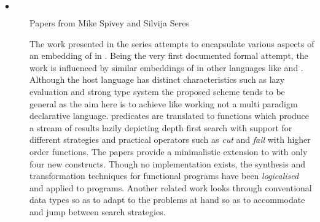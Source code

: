 \documentclass[thesis-solanki.tex]{subfiles}
\begin{document}
\begin{description}

\item[$\bullet$] Papers from Mike Spivey and Silvija Seres


The work presented in the series
\cite{spivey1999embedding,seres1999algebra,seres2001higher,spivey1999algebra,seres2001algebra} attempts to
encapsulate various aspects of an embedding of  in .
Being the very first documented formal attempt, the work is influenced by similar embeddings of 
in other languages like  and .
Although the host language has distinct characteristics such as lazy evaluation and strong type system the proposed
scheme tends to be general as the aim here is to achieve  like working not a multi paradigm
declarative language.
 predicates are translated to  functions which produce a stream of results
lazily depicting depth first search with support for different strategies and practical operators such as
\textit{cut} and \textit{fail} with higher order functions.
The papers provide a minimalistic extension to  with only four new constructs.
Though no implementation exists, the synthesis and transformation techniques for functional programs have been
\textit{logicalised} and applied to  programs.
Another related work \cite{spivey2000functional} looks through conventional data types so as to adapt to the
problems at hand so as to accommodate and jump between search strategies.

\begin{comment}
\begin{enumerate}

\item Embedding Prolog in Haskell / Functional Reading of Logic Programs, \cite{spivey1999embedding}
\\* \url{http://spivey.oriel.ox.ac.uk/mike/silvija/seres\_haskell99.pdf}

\subparagraph{}
This is one of the very first attempts to implement Prolog in Haskell, though there have been attempts and / or implementations of Prolog in other languages like Java(GNU Prolog, ISO Prolog as a library), Scheme(Scheme Prolog 1.2, pure Prolog interpreter, late 1980's early 1990's, 1993), Lisp (LogLisp 1982, QLog 1982) among others. There is a Hugs 98 implementation for Prolog(Mini Prolog, 1991-1996) for Hugs 1.3, but there has been no published work.


\end{comment}
\end{description}
\end{document}
